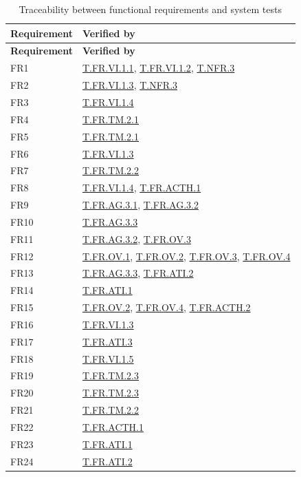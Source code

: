 \documentclass[12pt, titlepage]{article}
\begin{document}
\begin{xltabular}{\textwidth}{@{} l >{\raggedright\arraybackslash}X @{}}
\caption{Traceability between functional requirements and system tests}\label{tab:fr-traceability}\\
\toprule
\textbf{Requirement} & \textbf{Verified by}\\
\midrule
\endfirsthead
\toprule
\textbf{Requirement} & \textbf{Verified by}\\
\midrule
\endhead
\bottomrule
\endfoot
FR1 & \hyperref[test:T.FR.VI.1.1]{T.FR.VI.1.1}, \hyperref[test:T.FR.VI.1.2]{T.FR.VI.1.2}, \hyperref[test:T.NFR.3]{T.NFR.3}\\
FR2 & \hyperref[test:T.FR.VI.1.3]{T.FR.VI.1.3}, \hyperref[test:T.NFR.3]{T.NFR.3}\\
FR3 & \hyperref[test:T.FR.VI.1.4]{T.FR.VI.1.4}\\
FR4 & \hyperref[test:T.FR.TM.2.1]{T.FR.TM.2.1}\\
FR5 & \hyperref[test:T.FR.TM.2.1]{T.FR.TM.2.1}\\
FR6 & \hyperref[test:T.FR.VI.1.3]{T.FR.VI.1.3}\\
FR7 & \hyperref[test:T.FR.TM.2.2]{T.FR.TM.2.2}\\
FR8 & \hyperref[test:T.FR.VI.1.4]{T.FR.VI.1.4}, \hyperref[test:T.FR.ACTH.1]{T.FR.ACTH.1}\\
FR9 & \hyperref[test:T.FR.AG.3.1]{T.FR.AG.3.1}, \hyperref[test:T.FR.AG.3.2]{T.FR.AG.3.2}\\
FR10 & \hyperref[test:T.FR.AG.3.3]{T.FR.AG.3.3}\\
FR11 & \hyperref[test:T.FR.AG.3.2]{T.FR.AG.3.2}, \hyperref[test:T.FR.OV.3]{T.FR.OV.3}\\
FR12 & \hyperref[test:T.FR.OV.1]{T.FR.OV.1}, \hyperref[test:T.FR.OV.2]{T.FR.OV.2}, \hyperref[test:T.FR.OV.3]{T.FR.OV.3}, \hyperref[test:T.FR.OV.4]{T.FR.OV.4}\\
FR13 & \hyperref[test:T.FR.AG.3.3]{T.FR.AG.3.3}, \hyperref[test:T.FR.ATI.2]{T.FR.ATI.2}\\
FR14 & \hyperref[test:T.FR.ATI.1]{T.FR.ATI.1}\\
FR15 & \hyperref[test:T.FR.OV.2]{T.FR.OV.2}, \hyperref[test:T.FR.OV.4]{T.FR.OV.4}, \hyperref[test:T.FR.ACTH.2]{T.FR.ACTH.2}\\
FR16 & \hyperref[test:T.FR.VI.1.3]{T.FR.VI.1.3}\\
FR17 & \hyperref[test:T.FR.ATI.3]{T.FR.ATI.3}\\
FR18 & \hyperref[test:T.FR.VI.1.5]{T.FR.VI.1.5}\\
FR19 & \hyperref[test:T.FR.TM.2.3]{T.FR.TM.2.3}\\
FR20 & \hyperref[test:T.FR.TM.2.3]{T.FR.TM.2.3}\\
FR21 & \hyperref[test:T.FR.TM.2.2]{T.FR.TM.2.2}\\
FR22 & \hyperref[test:T.FR.ACTH.1]{T.FR.ACTH.1}\\
FR23 & \hyperref[test:T.FR.ATI.1]{T.FR.ATI.1}\\
FR24 & \hyperref[test:T.FR.ATI.2]{T.FR.ATI.2}\\
\end{xltabular}
\endgroup
\end{document}
